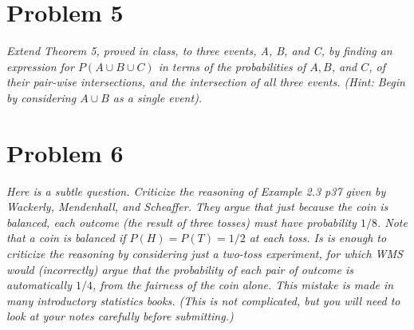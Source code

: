 \documentclass{article}
\begin{document}
\section*{Problem 5}
	\emph{Extend Theorem 5, proved in class, to three events, A, B, and C, by finding an expression for $P(A \cup B \cup C)$ in terms of the probabilities of $A, B$, and $C$, of their pair-wise intersections, and the intersection of all three events. (Hint: Begin by considering $A \cup B$ as a single event). }
\pagebreak
\section*{Problem 6}
	\emph{Here is a subtle question. Criticize the reasoning of Example 2.3 p37 given by Wackerly, Mendenhall, and Scheaffer. They argue that just because the coin is balanced, each outcome (the result of three tosses) must have probability $1/8$. Note that a coin is balanced if $P(H) = P(T) = 1/2$ at each toss. Is is enough to criticize the reasoning by considering just a two-toss experiment, for which WMS would (incorrectly) argue that the probability of each pair of outcome is automatically $1/4$, from the fairness of the coin alone. This mistake is made in many introductory statistics books. (This is not complicated, but you will need to look at your notes carefully before submitting.)
	}
\pagebreak
\end{document}
